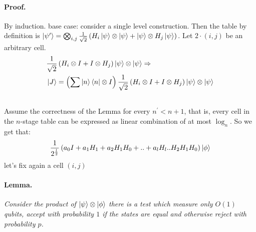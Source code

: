 \documentclass{article}
\begin{document}
\begin{multicols*}{2}
\paragraph{Proof.} By induction. base case: consider a single level construction. Then the table by definition is   \(\ket{\psi^\prime} = \bigotimes_{i,j}\frac{1}{\sqrt{2}}\left(H_i\ket{\psi}\otimes \ket{\psi}+ \ket{\psi}\otimes H_j \ket{\psi}\right)\). Let \(2\cdot(i,j)\) be an arbitrary cell.
\begin{equation*}
    \begin{split}
        &  \frac{1}{\sqrt{2}}\left( H_i \otimes I + I \otimes H_j \right) \ket{\psi}\otimes  \ket{\psi} \Rightarrow \\
        & \ket{J} = \left(\sum{\ket{n}\bra{n} \otimes I }\right)\frac{1}{\sqrt{2}}\left( H_i \otimes I + I \otimes H_j \right) \ket{\psi}\otimes  \ket{\psi} \\ 
        & 
    \end{split}
\end{equation*}
Assume the correctness of the Lemma for every \(n^\prime < n+1\), that is, every cell in the \(n\)-stage table can be expressed as linear combination of at most \(\log_n\). So we get that:
\begin{equation*}
    \begin{split}
        \frac{1}{2^{\frac{l}{2}}}\left(a_{0}I + a_{1}H_{1} + a_{2}H_{1}H_{0} + .. + a_{l}H_{l}..H_{2}H_{1}H_{0}\right)\ket{\phi} 
    \end{split}
\end{equation*}let's fix again a cell \((i,j)\) 

\paragraph{Lemma.} \textit{ Consider the product of \(\ket{\psi}\otimes\ket{\phi}\) there is a test which measure only \( O(1) \) qubits, accept with probability \(1\) if the states are equal and otherwise reject with probability \( p \).} 

\end{multicols*}
\end{document}
